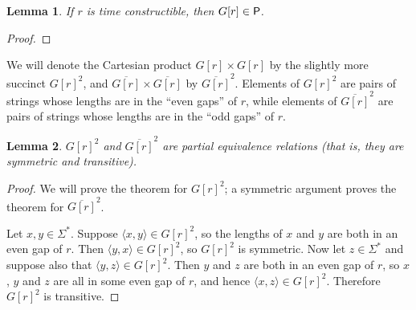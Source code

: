 \documentclass{article}
\newtheorem{lemma}[lemma]{Lemma}
\theoremstyle{definition} \newtheorem{definition}[definition]{Definition}
\newcommand{\pair}[2]{\langle#1,#2\rangle} %
\begin{document}
\begin{lemma}\label{lem:gap_p}
  If $r$ is time constructible, then $G[r]\in\P$.
\end{lemma}
\begin{proof}
\end{proof}

We will denote the Cartesian product $G[r]\times G[r]$ by the slightly more
succinct ${G[r]}^2$, and $\overline{G[r]}\times\overline{G[r]}$ by
$\overline{G[r]}^2$. Elements of ${G[r]}^2$ are pairs of strings whose lengths
are in the ``even gaps'' of $r$, while elements of $\overline{G[r]}^2$ are
pairs of strings whose lengths are in the ``odd gaps'' of $r$.

\begin{lemma}
  ${G[r]}^2$ and $\overline{G[r]}^2$ are partial equivalence relations (that
  is, they are symmetric and transitive).
\end{lemma}
\begin{proof}
  We will prove the theorem for ${G[r]}^2$; a symmetric argument proves the
  theorem for $\overline{G[r]}^2$.

  Let $x,y\in\Sigma^*$. Suppose $\pair{x}{y}\in {G[r]}^2$, so the lengths of
  $x$ and $y$ are both in an even gap of $r$. Then $\pair{y}{x}\in{G[r]}^2$, so
  ${G[r]}^2$ is symmetric. Now let $z\in\Sigma^*$ and suppose also that
  $\pair{y}{z}\in {G[r]}^2$. Then $y$ and $z$ are both in an even gap of $r$,
  so $x$, $y$ and $z$ are all in some even gap of $r$, and hence
  $\pair{x}{z}\in {G[r]}^2$. Therefore ${G[r]}^2$ is transitive.
\end{proof}
\end{document}
